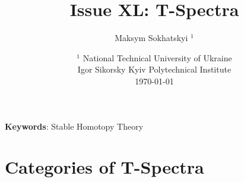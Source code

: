 \documentclass{article}
\begin{document}
\title{Issue XL: T-Spectra}
\author{Maksym Sokhatskyi $^1$}
\date{ $^1$ National Technical University of Ukraine \\
       \small Igor Sikorsky Kyiv Polytechnical Institute \\
       \today }

\maketitle

\begin{abstract}
\end{abstract}

{\bf Keywords}: Stable Homotopy Theory

\ifincludeTOC
  \tableofcontents
\fi

\section{Categories of T-Spectra}
\end{document}
